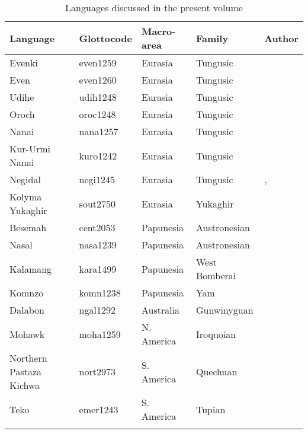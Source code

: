 \documentclass[output=paper]{langscibook}
\begin{document}
\begin{table}
\begin{tabularx}{\textwidth}{QlllQ}
\lsptoprule
Language & {Glottocode} & {Macro-area} & {Family} & {Author}\\
\midrule
Evenki & even1259 & Eurasia & Tungusic & \citeauthor{chapters/klyachko}\\
\tablevspace
Even & even1260 & Eurasia & Tungusic & \citeauthor{chapters/klyachko}\\
\tablevspace
Udihe & udih1248 & Eurasia & Tungusic & \citeauthor{chapters/klyachko}\\
\tablevspace
Oroch & oroc1248 & Eurasia & Tungusic & \citeauthor{chapters/klyachko}\\
\tablevspace
Nanai & nana1257 & Eurasia & Tungusic & \citeauthor{chapters/klyachko}\\
\tablevspace
Kur-Urmi Nanai & kuro1242 & Eurasia & Tungusic & \citeauthor{chapters/klyachko}\\
\tablevspace
Negidal & negi1245 & Eurasia & Tungusic & \citeauthor{chapters/pakendorf}, \citeauthor{chapters/klyachko}\\
\tablevspace
Kolyma Yukaghir & sout2750 & Eurasia & Yukaghir & \citeauthor{chapters/ventayol_boada}\\
\tablevspace
Besemah & cent2053 & Papunesia & Austronesian & \citeauthor{chapters/mcdonnell_billings}\\
\tablevspace
Nasal & nasa1239 & Papunesia & Austronesian & \citeauthor{chapters/billings_mcdonnell}\\
\tablevspace
Kalamang & kara1499 & Papunesia & West Bomberai & \citeauthor{chapters/visser}\\
\tablevspace
Komnzo & komn1238 & Papunesia & Yam & \citeauthor{chapters/doehler}\\
\tablevspace
Dalabon & ngal1292 & Australia & Gunwinyguan & \citeauthor{chapters/ponsonnet}\\
\tablevspace
Mohawk & moha1259 & N. America & Iroquoian & \citeauthor{chapters/mithun}\\
\tablevspace
Northern Pastaza Kichwa & nort2973 & S. America & Quechuan & \citeauthor{chapters/rice}\\
\tablevspace
Teko & emer1243 & S. America & Tupian & \citeauthor{chapters/rose}\\
\lspbottomrule
\end{tabularx}
\caption{Languages discussed in the present volume}
\label{tab:intro:2}
\end{table}
\end{document}
